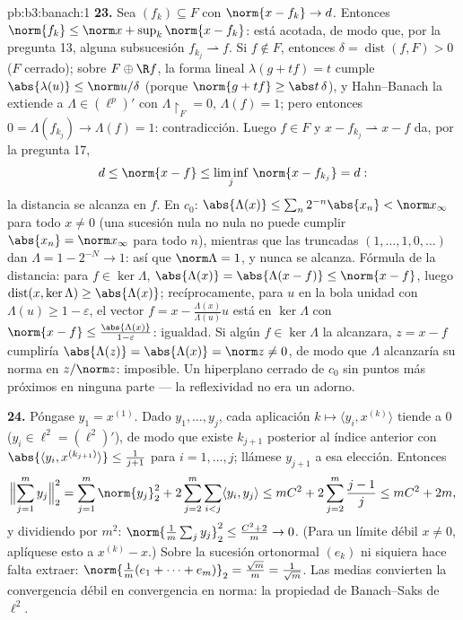 \begin{solution}{pb:b3:banach:1}
\textbf{23.} Sea $(f_k) \subseteq F$ con $\norm{x - f_k}
\to d$. Entonces $\norm{f_k} \leq \norm x + \sup_k\norm{x -
f_k}$: está acotada, de modo que, por la pregunta 13, alguna subsucesión
$f_{k_j}
\rightharpoonup f$. Si $f \notin F$, entonces $\delta =
\operatorname{dist}(f, F) > 0$ ($F$ cerrado); sobre $F \oplus \R
f$, la forma lineal $\lambda(g + tf) = t$ cumple
$\abs{\lambda(u)} \leq \norm u/\delta$ (porque $\norm{g +
tf} \geq \abs t\,\delta$), y Hahn--Banach la extiende a
$\Lambda \in (\ell^p)'$ con $\Lambda\restriction_F = 0$,
$\Lambda(f) = 1$; pero entonces $0 = \Lambda(f_{k_j}) \to
\Lambda(f) = 1$: contradicción. Luego $f \in F$ y $x -
f_{k_j} \rightharpoonup x - f$ da, por la pregunta 17,
\[
d \leq \norm{x - f} \leq \liminf_j\,\norm{x - f_{k_j}} = d :
\]
la distancia se alcanza en $f$. En $c_0$: $\abs{\Lambda(x)}
\leq \sum_n2^{-n}\abs{x_n} < \norm x_\infty$ para todo $x
\neq 0$ (una sucesión nula no nula no puede cumplir $\abs{x_n} =
\norm x_\infty$ para todo $n$), mientras que las truncadas $(1,
\dots, 1, 0, \dots)$ dan $\Lambda = 1 - 2^{-N} \to 1$: así que
$\norm\Lambda = 1$, y nunca se alcanza. Fórmula de la distancia: para $f
\in \ker\Lambda$, $\abs{\Lambda(x)} = \abs{\Lambda(x - f)}
\leq \norm{x - f}$, luego $\operatorname{dist}(x, \ker\Lambda)
\geq \abs{\Lambda(x)}$; recíprocamente, para $u$ en la bola unidad con
$\Lambda(u) \geq 1 - \varepsilon$, el vector $f = x -
\frac{\Lambda(x)}{\Lambda(u)}u$ está en $\ker\Lambda$ con
$\norm{x - f} \leq \frac{\abs{\Lambda(x)}}{1 - \varepsilon}$:
igualdad. Si algún $f \in \ker\Lambda$ la alcanzara, $z = x -
f$ cumpliría $\abs{\Lambda(z)} = \abs{\Lambda(x)} =
\norm z \neq 0$, de modo que $\Lambda$ alcanzaría su norma en
$z/\norm z$: imposible. Un hiperplano cerrado de $c_0$ sin puntos más
próximos en ninguna parte --- la reflexividad no era un adorno.

\textbf{24.} Póngase $y_1 = x^{(1)}$. Dado $y_1, \dots, y_j$, cada
aplicación $k \mapsto \langle y_i, x^{(k)}\rangle$ tiende a $0$
($y_i \in \ell^2 = (\ell^2)'$), de modo que existe $k_{j+1}$ posterior
al índice anterior con $\abs{\langle y_i,
x^{(k_{j+1})}\rangle} \leq \frac1{j+1}$ para $i = 1, \dots,
j$; llámese $y_{j+1}$ a esa elección. Entonces
\[
\Bigl\lVert\sum_{j=1}^my_j\Bigr\rVert_2^2
= \sum_{j=1}^m\norm{y_j}_2^2
+ 2\sum_{j=2}^m\sum_{i<j}\langle y_i, y_j\rangle
\leq mC^2 + 2\sum_{j=2}^m\frac{j-1}j
\leq mC^2 + 2m,
\]
y dividiendo por $m^2$: $\norm{\frac1m\sum_jy_j}_2^2 \leq
\frac{C^2 + 2}m \to 0$. (Para un límite débil $x \neq 0$, aplíquese esto
a $x^{(k)} - x$.) Sobre la sucesión ortonormal $(e_k)$ ni siquiera hace
falta extraer: $\norm{\frac1m(e_1 + \dots +
e_m)}_2 = \frac{\sqrt m}m = \frac1{\sqrt m}$. Las medias convierten la
convergencia débil en convergencia en norma: la propiedad de
Banach--Saks de $\ell^2$.


\end{solution}
